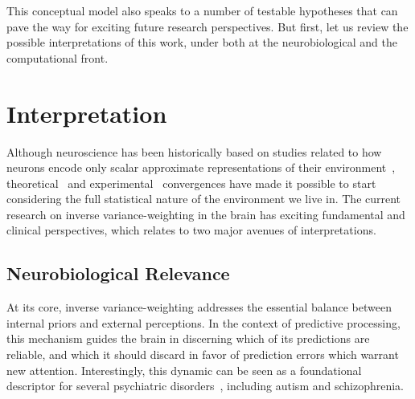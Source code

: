 
This conceptual model also speaks to a number of testable hypotheses that can pave the way for exciting future research perspectives. But first, let us review the possible interpretations of this work, under both at the neurobiological and the computational front.



\section{Interpretation}
Although neuroscience has been historically based on studies related to how neurons encode only scalar approximate representations of their environment~\cite{sherrington1906observations, hubel1959receptive, o1971hippocampus}, theoretical~\cite{barlow1961possible} and experimental~\cite{leon2012motion} convergences have made it possible to start considering the full statistical nature of the environment we live in. The current research on inverse variance-weighting in the brain has exciting fundamental and clinical perspectives, which relates to two major avenues of interpretations. 



\subsection{Neurobiological Relevance}
At its core, inverse variance-weighting addresses the essential balance between internal priors and external perceptions. In the context of predictive processing, this mechanism guides the brain in discerning which of its predictions are reliable, and which it should discard in favor of prediction errors which warrant new attention. Interestingly, this dynamic can be seen as a foundational descriptor for several psychiatric disorders~\cite{friston2023computational}, including autism and schizophrenia.

